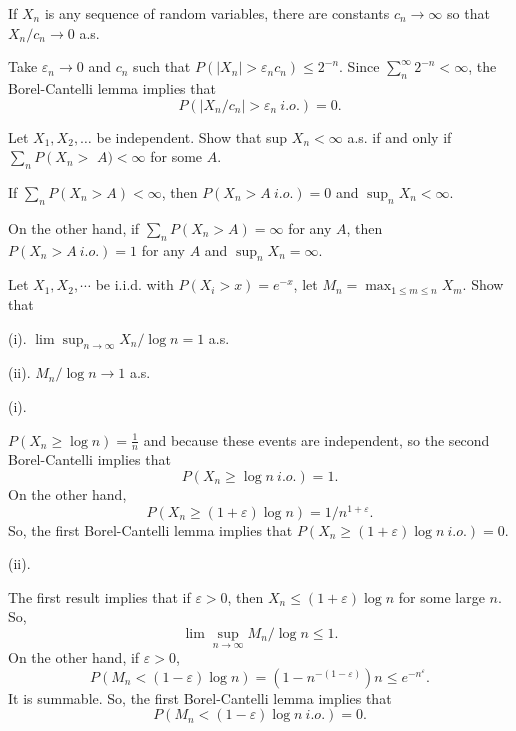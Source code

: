 \documentclass[en, normal, 11pt, black]{elegantnote}
\newenvironment{exercise}[1]{\begin{tcolorbox}[colback=black!15, colframe=black!80, breakable, title=#1]}{\end{tcolorbox}}
\newenvironment{solution}{\begin{tcolorbox}[colback=white, colframe=black!50, breakable, title=Solution. ]\setlength{\parskip}{0.8em}}{\end{tcolorbox}}
\begin{document}
    \begin{exercise}{2.3.13}
        If $X_{n}$ is any sequence of random variables, there are constants $c_{n} \rightarrow \infty$ so that $X_{n} / c_{n} \rightarrow 0$ a.s. 
    \end{exercise}

    \begin{solution}
        Take $\varepsilon_n\to 0$ and $c_n$ such that $P(|X_n| > \varepsilon_nc_n ) \leqslant 2^{-n}$. Since $\sum_n^\infty 2^{-n} < \infty$, the Borel-Cantelli lemma implies that 
        \[
            P(|X_n/c_n| > \varepsilon_n\ i.o.) = 0. 
        \]
    \end{solution}

    \begin{exercise}{2.3.14}
        Let $X_{1}, X_{2}, \ldots$ be independent. Show that sup $X_{n}<\infty$ a.s. if and only if $\sum_{n} P\left(X_{n}>\right.$ $A)<\infty$ for some $A$. 
    \end{exercise} 

    \begin{solution}
        If $\sum_nP(X_n >A)<\infty$, then $P(X_n >A\ i.o.)=0$ and $\sup_nX_n <\infty$. 
        
        On the other hand, if $\sum_nP(X_n >A)=\infty$ for any $A$, then $P(X_n >A\ i.o.)=1$ for any $A$ and $\sup_n X_n = \infty$. 
    \end{solution}
    
    \begin{exercise}{2.3.15}
        Let $X_{1}, X_{2}, \cdots$ be i.i.d. with $P\left(X_{i}>x\right)=e^{-x}$, let $M_{n}=\max _{1 \leq m \leq n} X_{m} .$ Show that 
        
        (i). $\lim \sup _{n \rightarrow \infty} X_{n} / \log n=1$ a.s. 
        
        (ii). $M_{n} / \log n \rightarrow 1$ a.s. 
    \end{exercise}

    \begin{solution}
        (i). 
        
        $P (X_n \geqslant \log n) = \frac{1}{n}$ and because these events are independent, so the second Borel-Cantelli implies that 
        \[
            P (X_n \geqslant \log n\ i.o.) = 1. 
        \]
        On the other hand, 
        \[
            P (X_n \geqslant (1 + \varepsilon) \log n) = 1/n^{1+\varepsilon}. 
        \]
        So, the first Borel-Cantelli lemma implies that $P (X_n \geqslant (1 + \varepsilon) \log n\ i.o.) = 0$. 

        (ii). 

        The first result implies that if $\varepsilon > 0$, then $X_n \leqslant (1 + \varepsilon)\log n$ for some large $n$. So, 
        \[
            \lim\sup_{n\to\infty} M_n/\log n \leqslant 1. 
        \]
        On the other hand, if $\varepsilon > 0$, 
        \[
            P(M_n < (1-\varepsilon)\log n) = (1-n^{-(1-\varepsilon)})n \leqslant e^{-n^\varepsilon}. 
        \]
        It is summable. So, the first Borel-Cantelli lemma implies that 
        \[
            P(M_n<(1-\varepsilon)\log n\ i.o.)=0. 
        \]
    \end{solution}
\end{document}
